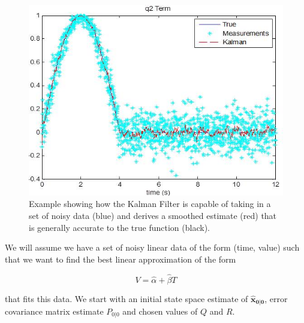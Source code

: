 \begin{figure}[h]
\centering
\includegraphics{body/methodology/q2_kalman.jpg}
\caption[Kalman Filter Graphic Example]{Example showing how the Kalman Filter is capable of taking in a set of noisy data (blue) and derives a smoothed estimate (red) that is generally accurate to the true function (black).}
\label{fig:kfexamp}
\end{figure}


We will assume we have a set of noisy linear data of the form (time, value) such that we want to find the best linear approximation of the form 

\begin{equation} 
V = \hat{\alpha} + \hat{\beta}T
\end{equation}

that fits this data. We start with an initial state space estimate of $\bm{\hat{x}_{0|0}}$, error covariance matrix estimate $P_{0|0}$ and chosen values of $Q$ and $R$.

